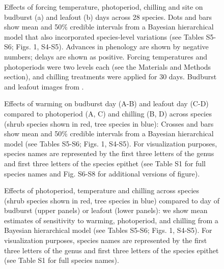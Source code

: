 \documentclass[11pt]{article}
\begin{document}
\newpage
\begin{figure}[h!]
\centering
\caption{Effects of forcing temperature, photoperiod, chilling and site on budburst (a) and leafout (b) days across 28 species. Dots and bars show mean and 50\% credible intervals from a Bayesian hierarchical model that also incorporated species-level variations (see Tables S5-S6; Figs. 1, S4-S5). Advances in phenology are shown by negative numbers; delays are shown as positive. Forcing temperatures and photoperiods were two levels each (see the Materials and Methods section), and chilling treatments were applied for 30 days. Budburst and leafout images from \citet{Finn:2007}.}
\label{fig:maineff}
\end{figure}

\newpage
\begin{figure}[h!]
\centering
\caption{Effects of warming on budburst day (A-B) and leafout day (C-D) compared to photoperiod (A, C) and chilling (B, D) across species (shrub species shown in red, tree species in blue): Crosses and bars show mean and 50\% credible intervals from a Bayesian hierarchical model (see Tables S5-S6; Figs. 1, S4-S5). For visualization purposes, species names are represented by the first three letters of the genus and first three letters of the species epithet (see Table S1 for full species names and Fig. S6-S8 for additional versions of figure).}
\label{fig:sppeff}
\end{figure}

\newpage
\begin{figure}
\caption{Effects of photoperiod, temperature and chilling across species (shrub species shown in red, tree species in blue) compared to day of budburst (upper panels) or leafout (lower panels): we show mean estimates of sensitivity to warming, photoperiod, and chilling from a Bayesian hierarchical model (see Tables S5-S6; Figs. 1, S4-S5). For visualization purposes, species names are represented by the first three letters of the genus and first three letters of the species epithet (see Table S1 for full species names).}
\label{fig:commsens}
\end{figure}
\end{document}
